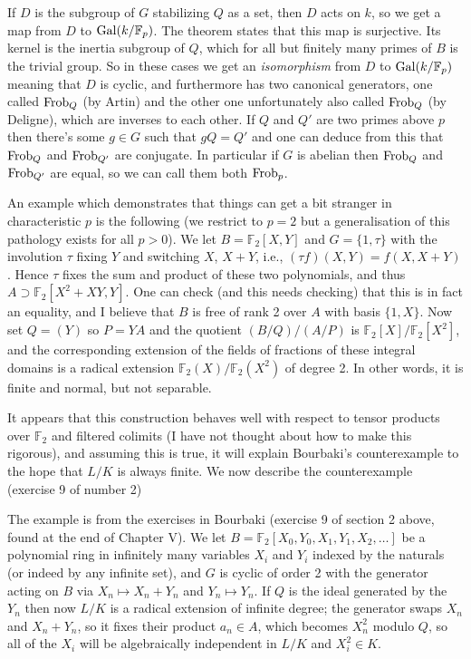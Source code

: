 If $D$ is the subgroup of $G$ stabilizing $Q$ as a set, then $D$ acts on $k$, so we get
a map from $D$ to $\operatorname{Gal}(k/\mathbb{F}_p)$. The theorem states that this map is surjective.
Its kernel is the inertia subgroup of $Q$, which for all but finitely many primes of $B$
is the trivial group. So in these cases we get an \emph{isomorphism} from $D$ to $\operatorname{Gal}(k/\mathbb{F}_p)$
meaning that $D$ is cyclic, and furthermore has two canonical generators, one called $\operatorname{Frob}_Q$
(by Artin) and the other one unfortunately also called $\operatorname{Frob}_Q$ (by Deligne), which are inverses
to each other. If $Q$ and $Q'$ are two primes above $p$ then there's some $g\in G$ such that
$gQ=Q'$ and one can deduce from this that $\operatorname{Frob}_Q$ and $\operatorname{Frob}_{Q'}$ are conjugate. In particular
if $G$ is abelian then $\operatorname{Frob}_Q$ and $\operatorname{Frob}_{Q'}$ are equal, so we can call them both $\operatorname{Frob}_p$.

An example which demonstrates that things can get a bit stranger in characteristic $p$ is the
following (we restrict to $p=2$ but a generalisation of this pathology exists for all $p>0$).
We let $B=\mathbb{F}_2[X,Y]$ and $G=\{1,\tau\}$ with the involution $\tau$
fixing $Y$ and switching $X$, $X+Y$, i.e., $(\tau f)(X,Y)=f(X,X+Y)$.
Hence $\tau$ fixes the sum and product of these two polynomials, and thus
$A\supset \mathbb{F}_2[X^2+XY,Y]$. One can check (and this needs checking) that this
is in fact an equality, and I believe that $B$ is free of
rank 2 over $A$ with basis $\{1,X\}$.
Now set $Q=(Y)$ so $P=YA$ and the quotient $(B/Q)/(A/P)$ is
$\mathbb{F}_2[X]/\mathbb{F}_2[X^2]$, and the corresponding extension
of the fields of fractions of these integral domains is a radical extension
$\mathbb{F}_2(X)/\mathbb{F}_2(X^2)$ of degree 2.
In other words, it is finite and normal, but not separable.

It appears that this construction behaves well with respect to tensor
products over $\mathbb{F}_2$ and filtered colimits (I have not thought about
how to make this rigorous), and assuming this is true, it will explain Bourbaki's
counterexample to the hope that $L/K$ is always finite. We now describe the counterexample
(exercise 9 of number 2)

The example is from the exercises in Bourbaki (exercise 9 of section 2 above, found at the end
of Chapter V). We let $B=\mathbb{F}_2[X_0,Y_0,X_1,Y_1,X_2,\ldots]$
be a polynomial ring in infinitely many variables $X_i$ and $Y_i$ indexed by the
naturals (or indeed by any infinite set), and $G$ is cyclic of order 2 with
the generator acting on $B$ via $X_n\mapsto X_n+Y_n$ and $Y_n\mapsto Y_n$.
If $Q$ is the ideal generated by the $Y_n$ then now $L/K$ is a radical extension of
infinite degree; the generator swaps $X_n$ and $X_n+Y_n$, so it fixes
their product $a_n\in A$, which becomes $X_n^2$ modulo $Q$, so all
of the $X_{i}$ will be algebraically independent in $L/K$ and $X_{i}^2\in K$.

